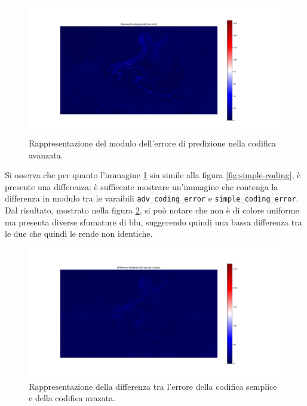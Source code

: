\begin{figure}[h]
    \centering
    \includegraphics[width = .9\textwidth]{hw-1/report/imgs/advanced-coding.png}
    \caption{Rappresentazione del modulo dell'errore di predizione nella codifica avanzata.}
    \label{fig:advanced-coding}
\end{figure}

\FloatBarrier\noindent Si osserva che per quanto l'immagine \ref{fig:advanced-coding} sia simile alla figura \ref{fig:simple-coding}, è presente una differenza: è sufficente mostrare un'immagine che contenga la differenza in modulo tra le varaibili \texttt{adv\_coding\_error} e \texttt{simple\_coding\_error}. Dal risultato, mostrato nella figura \ref{fig:error-difference}, si può notare che non è di colore uniforme ma presenta diverse sfumature di blu, suggerendo quindi una bassa differenza tra le due che quindi le rende non identiche.

\begin{figure}[h]
    \centering
    \includegraphics[width = .9\textwidth]{hw-1/report/imgs/error-difference.png}
    \caption{Rappresentazione della differenza tra l'errore della codifica semplice e della codifica avazata.}
    \label{fig:error-difference}
\end{figure}

